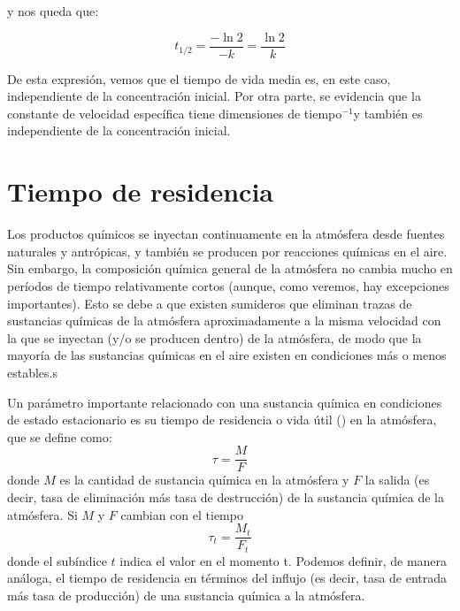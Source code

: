 y nos queda que:

$$t_{1/2}=\frac{-\ln2}{-k}=\frac{\ln2}{k}$$

De esta expresión, vemos que el tiempo de vida media es, en este caso, independiente de la concentración inicial. Por otra parte, se evidencia que la constante de velocidad específica tiene dimensiones de tiempo$^{-1}$y también es independiente de la concentración inicial.

\section{Tiempo de residencia}
Los productos químicos se inyectan continuamente en la atmósfera desde fuentes naturales y antrópicas, y también se producen por reacciones químicas en el aire. Sin embargo, la composición química general de la atmósfera no cambia mucho en períodos de tiempo relativamente cortos (aunque, como veremos, hay excepciones importantes). Esto se debe a que existen sumideros que eliminan trazas de sustancias químicas de la atmósfera aproximadamente a la misma velocidad con la que se inyectan (y/o se producen dentro) de la atmósfera, de modo que la mayoría de las sustancias químicas en el aire existen en condiciones más o menos estables.s

Un parámetro importante relacionado con una sustancia química en condiciones de estado estacionario es su tiempo de residencia o vida útil () en la atmósfera, que se define como:
\begin{equation*}
\tau=\frac{M}{F}
\end{equation*}
donde $M$ es la cantidad de sustancia química en la atmósfera y $F$ la salida (es decir, tasa de eliminación más tasa de destrucción) de la sustancia química de la atmósfera. Si $M$ y $F$ cambian con el tiempo
\begin{equation*}
\tau_t=\frac{M_t}{F_t}
\end{equation*}
donde el subíndice $t$ indica el valor en el momento t. Podemos definir, de manera análoga, el tiempo de residencia en términos del influjo (es decir, tasa de entrada más tasa de producción) de una sustancia química a la atmósfera.

